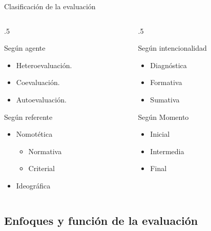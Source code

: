 \documentclass[11pt, aspectratio=169, xcolor=table,hyphens]{beamer}
\begin{document}
\begin{frame}{Clasificación de la evaluación \cite{CASTILLO2010}}
	\begin{columns}
		\begin{column}{.5\textwidth}
			\begin{block}{Según agente}
				\begin{itemize}[<+->]
					\item Heteroevaluación.
					\item Coevaluación.
					\item Autoevaluación.
				\end{itemize}
			\end{block}
			\begin{block}{Según referente}
				\begin{itemize}[<+->]
					\item Nomotética
					      \begin{itemize}[<+->]
						      \item Normativa
						      \item Criterial
					      \end{itemize}
					\item Ideográfica
				\end{itemize}
			\end{block}
		\end{column}
		\begin{column}{.5\textwidth}
			\begin{block}{Según intencionalidad}
				\begin{itemize}[<+->]
					\item Diagnóstica
					\item Formativa
					\item Sumativa
				\end{itemize}
			\end{block}
			\begin{block}{Según Momento}
				\begin{itemize}[<+->]
					\item Inicial
					\item Intermedia
					\item Final
				\end{itemize}
			\end{block}
		\end{column}
	\end{columns}
\end{frame}

\subsection{Enfoques y función de la evaluación}
\end{document}
